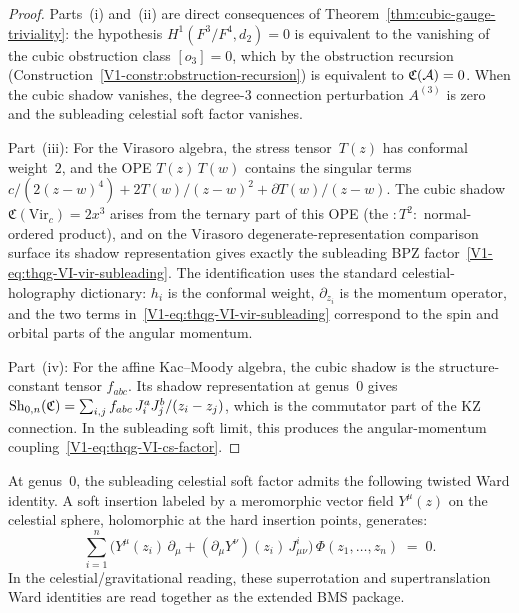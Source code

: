 \begin{proof}
Parts~(i) and~(ii) are direct consequences of
Theorem~\ref{thm:cubic-gauge-triviality}: the hypothesis
$H^1(F^3/F^4, d_2) = 0$ is equivalent to the vanishing of the
cubic obstruction class $[o_3] = 0$, which by the obstruction
recursion
(Construction~\ref{V1-constr:obstruction-recursion})
is equivalent to $\mathfrak{C}(\mathcal{A}) = 0$. When the cubic shadow
vanishes, the degree-$3$ connection perturbation $A^{(3)}$ is zero
and the subleading celestial soft factor vanishes.

Part~(iii): For the Virasoro algebra, the stress tensor~$T(z)$
has conformal weight~$2$, and the OPE $T(z)\,T(w)$ contains the
singular terms $c/(2(z-w)^4) + 2T(w)/(z-w)^2 + \partial T(w)/(z-w)$.
The cubic shadow $\mathfrak{C}(\mathrm{Vir}_c) = 2x^3$ arises
from the ternary part of this OPE (the $:T^2:$ normal-ordered
product), and on the Virasoro degenerate-representation comparison
surface its shadow representation gives exactly the subleading BPZ
factor~\eqref{V1-eq:thqg-VI-vir-subleading}.
The identification uses the standard celestial-holography dictionary:
$h_i$ is the conformal weight, $\partial_{z_i}$ is the momentum
operator, and the two terms in~\eqref{V1-eq:thqg-VI-vir-subleading}
correspond to the spin and orbital parts of the angular momentum.

Part~(iv): For the affine Kac--Moody algebra, the cubic shadow
is the structure-constant tensor $f_{abc}$. Its shadow
representation at genus~$0$ gives
$\operatorname{Sh}_{0,n}(\mathfrak{C}) = \sum_{i,j} f_{abc}\,J^a_i J^b_j
/(z_i - z_j)$,
which is the commutator part of the KZ connection. In the
subleading soft limit, this produces the angular-momentum
coupling~\eqref{V1-eq:thqg-VI-cs-factor}.
\end{proof}

\begin{corollary}
\label{cor:thqg-VI-superrotation}
At genus~$0$, the subleading celestial soft factor admits the
following twisted Ward identity. A soft insertion labeled by a
meromorphic vector field $Y^\mu(z)$ on the celestial sphere,
holomorphic at the hard insertion points, generates:
\begin{equation}%
\sum_{i=1}^{n}
\bigl(Y^\mu(z_i)\,\partial_\mu
+ (\partial_\mu Y^\nu)(z_i)\,J^i_{\mu\nu}\bigr)\,
\Phi(z_1, \dotsc, z_n)
\;=\; 0.
\end{equation}
In the celestial/gravitational reading, these superrotation and
supertranslation Ward identities are read together as the extended
BMS package.
\end{corollary}

